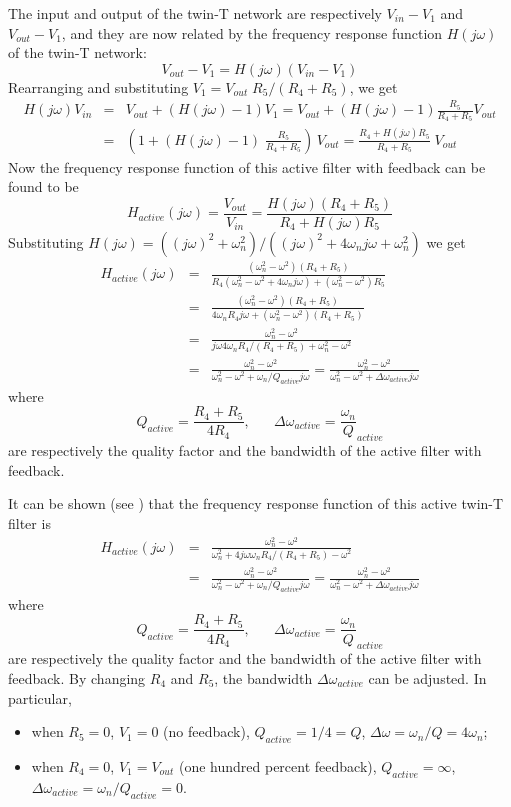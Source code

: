 The input and output of the twin-T network are respectively $V_{in}-V_1$ and
$V_{out}-V_1$, and they are now related by the frequency response function 
$H(j\omega)$ of the twin-T network:
\[
V_{out}-V_1=H(j\omega)(V_{in}-V_1)
\]
Rearranging and substituting $V_1=V_{out}\;R_5/(R_4+R_5)$, we get
\begin{eqnarray}
  H(j\omega)V_{in}&=&V_{out}+(H(j\omega)-1) V_1
  =V_{out}+(H(j\omega)-1)\frac{R_5}{R_4+R_5}V_{out}
  \nonumber \\
  &=&\left(1+(H(j\omega)-1)\;\frac{R_5}{R_4+R_5}\right)\,V_{out}
  =\frac{R_4+H(j\omega)R_5}{R_4+R_5}\;V_{out}
  \nonumber
\end{eqnarray}
Now the frequency response function of this active filter with feedback 
can be found to be
\[
H_{active}(j\omega)=\frac{V_{out}}{V_{in}}
=\frac{H(j\omega)(R_4+R_5)}{R_4+H(j\omega)R_5}
\]
Substituting $H(j\omega)=((j\omega)^2+\omega_n^2)/((j\omega)^2+4\omega_n j\omega
+\omega_n^2)$ we get
\begin{eqnarray}
  H_{active}(j\omega)&=&\frac{(\omega_n^2-\omega^2)(R_4+R_5)}
  {R_4(\omega_n^2-\omega^2+4\omega_n j\omega)+(\omega_n^2-\omega^2)R_5}
  \nonumber \\
  &=&\frac{(\omega_n^2-\omega^2)(R_4+R_5)}
  {4\omega_nR_4 j\omega+(\omega_n^2-\omega^2)(R_4+R_5)}
  \nonumber \\
  &=&\frac{\omega_n^2-\omega^2}{j\omega 4\omega_n R_4/(R_4+R_5)+\omega_n^2-\omega^2}
  \nonumber \\
  &=&\frac{\omega_n^2-\omega^2}{\omega_n^2-\omega^2+\omega_n/Q_{active} j\omega}
  =\frac{\omega_n^2-\omega^2}{\omega_n^2-\omega^2+\Delta\omega_{active} j\omega}
  \nonumber
\end{eqnarray}
where 
\[
Q_{active}=\frac{R_4+R_5}{4R_4},\;\;\;\;\;\;
\Delta\omega_{active}=\frac{\omega_n}{Q}_{active}
\]
are respectively the quality factor and the bandwidth of the active 
filter with feedback. 

It can be shown (see )
that the frequency response function of this active twin-T filter is
\begin{eqnarray}
H_{active}(j\omega)
&=&\frac{\omega_n^2-\omega^2}{\omega_n^2+4j\omega\omega_n R_4/(R_4+R_5)-\omega^2}
\nonumber\\
&=&\frac{\omega_n^2-\omega^2}{\omega_n^2-\omega^2+\omega_n/Q_{active} j\omega}
=\frac{\omega_n^2-\omega^2}{\omega_n^2-\omega^2+\Delta\omega_{active} j\omega}
\nonumber
\end{eqnarray}
where 
\[
Q_{active}=\frac{R_4+R_5}{4R_4},\;\;\;\;\;\;
\Delta\omega_{active}=\frac{\omega_n}{Q}_{active}
\]
are respectively the quality factor and the bandwidth of the active 
filter with feedback. By changing $R_4$ and $R_5$, the bandwidth 
$\Delta\omega_{active}$ can be adjusted. In particular, 
\begin{itemize}
\item when $R_5=0$, $V_1=0$ (no feedback), $Q_{active}=1/4=Q$, 
  $\Delta\omega=\omega_n/Q=4\omega_n$; 
\item when $R_4=0$, $V_1=V_{out}$ (one hundred percent feedback), 
  $Q_{active}=\infty$, $\Delta\omega_{active}=\omega_n/Q_{active}=0$.
\end{itemize}


